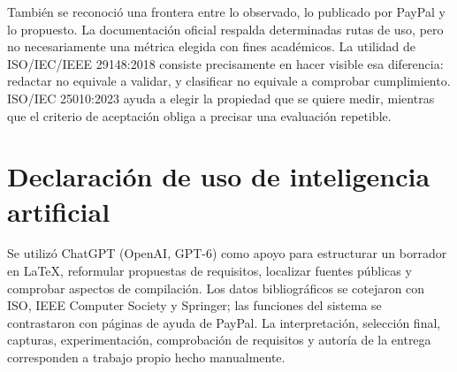 \documentclass[10pt,a4paper]{extarticle}
\begin{document}
También se reconoció una frontera entre lo observado, lo publicado por PayPal y lo propuesto. La documentación oficial respalda determinadas rutas de uso, pero no necesariamente una métrica elegida con fines académicos. La utilidad de ISO/IEC/IEEE 29148:2018 consiste precisamente en hacer visible esa diferencia: redactar no equivale a validar, y clasificar no equivale a comprobar cumplimiento. ISO/IEC 25010:2023 ayuda a elegir la propiedad que se quiere medir, mientras que el criterio de aceptación obliga a precisar una evaluación repetible. 

\section*{Declaración de uso de inteligencia artificial}
Se utilizó ChatGPT (OpenAI, GPT-6) como apoyo para estructurar un borrador en LaTeX, reformular propuestas de requisitos, localizar fuentes públicas y comprobar aspectos de compilación. Los datos bibliográficos se cotejaron con ISO, IEEE Computer Society y Springer; las funciones del sistema se contrastaron con páginas de ayuda de PayPal. La interpretación, selección final, capturas, experimentación, comprobación de requisitos y autoría de la entrega corresponden a trabajo propio hecho manualmente. 

\printbibliography[heading=bibintoc,title={Referencias (formato IEEE)}]
\end{document}
